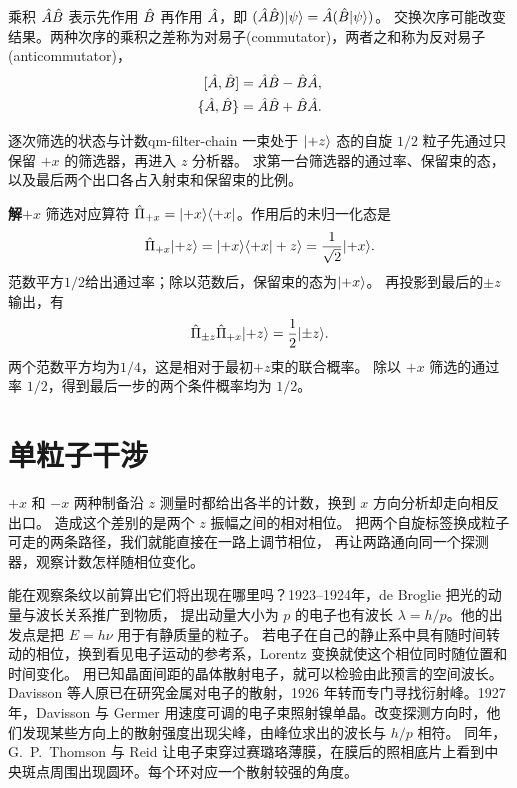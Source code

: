 \begin{remark}
    乘积 $\hat{A}\hat{B}$ 表示先作用 $\hat{B}$ 再作用 $\hat{A}$，即 $(\hat{A}\hat{B})\lvert\psi\rangle = \hat{A}(\hat{B}\lvert\psi\rangle)$。
    交换次序可能改变结果。两种次序的乘积之差称为对易子(commutator)，两者之和称为反对易子(anticommutator)，
    \begin{subequations}
        \begin{align}
            [\hat{A},\hat{B}] &= \hat{A}\hat{B} - \hat{B}\hat{A},\\
            \{\hat{A},\hat{B}\} &= \hat{A}\hat{B} + \hat{B}\hat{A} .
        \end{align}
    \end{subequations}
\end{remark}

\begin{example}{逐次筛选的状态与计数}{qm-filter-chain}
    一束处于 $\lvert+z\rangle$ 态的自旋 $1/2$ 粒子先通过只保留 $+x$ 的筛选器，再进入 $z$ 分析器。
    求第一台筛选器的通过率、保留束的态，以及最后两个出口各占入射束和保留束的比例。

    \par\smallskip\textbf{解}\quad $+x$ 筛选对应算符
    $\hat{\Pi}_{+x} = \lvert+x\rangle\langle+x\rvert$。作用后的未归一化态是
    \begin{equation}
        \hat{\Pi}_{+x}\lvert+z\rangle
        = \lvert+x\rangle\langle+x\vert+z\rangle
        = \frac1{\sqrt2}\lvert+x\rangle.
    \end{equation}
    范数平方$1/2$给出通过率；除以范数后，保留束的态为$\lvert+x\rangle$。
    再投影到最后的$\pm z$输出，有
    \begin{equation}
        \hat{\Pi}_{\pm z}\hat{\Pi}_{+x}\lvert+z\rangle = \frac12\lvert\pm z\rangle.
    \end{equation}
    两个范数平方均为$1/4$，这是相对于最初$+z$束的联合概率。
    除以 $+x$ 筛选的通过率 $1/2$，得到最后一步的两个条件概率均为 $1/2$。
\end{example}

\section{单粒子干涉}
\label{sec:interference}
$+x$ 和 $-x$ 两种制备沿 $z$ 测量时都给出各半的计数，换到 $x$ 方向分析却走向相反出口。
造成这个差别的是两个 $z$ 振幅之间的相对相位。
把两个自旋标签换成粒子可走的两条路径，我们就能直接在一路上调节相位，
再让两路通向同一个探测器，观察计数怎样随相位变化。

能在观察条纹以前算出它们将出现在哪里吗？1923--1924年，de Broglie 把光的动量与波长关系推广到物质，
提出动量大小为 $p$ 的电子也有波长 $\lambda = h/p$\cite{debroglie}。他的出发点是把 $E = h\nu$ 用于有静质量的粒子。
若电子在自己的静止系中具有随时间转动的相位，换到看见电子运动的参考系，Lorentz 变换就使这个相位同时随位置和时间变化。
用已知晶面间距的晶体散射电子，就可以检验由此预言的空间波长。
Davisson 等人原已在研究金属对电子的散射，1926 年转而专门寻找衍射峰。1927 年，\label{exp:qm-nickel-diffraction}Davisson 与 Germer 用速度可调的电子束照射镍单晶。改变探测方向时，他们发现某些方向上的散射强度出现尖峰，由峰位求出的波长与 $h/p$ 相符\cite{davisson}。
同年，\label{exp:qm-film-diffraction}G.~P.~Thomson 与 Reid 让电子束穿过赛璐珞薄膜，在膜后的照相底片上看到中央斑点周围出现圆环。每个环对应一个散射较强的角度\cite{thomsonreid}。

